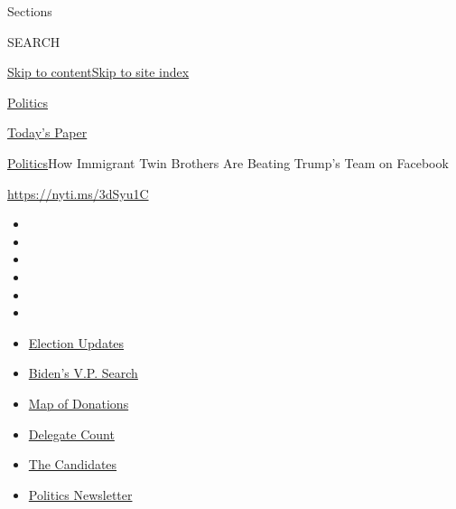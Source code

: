 Sections

SEARCH

\protect\hyperlink{site-content}{Skip to
content}\protect\hyperlink{site-index}{Skip to site index}

\href{https://www.nytimes3xbfgragh.onion/section/politics}{Politics}

\href{https://myaccount.nytimes3xbfgragh.onion/auth/login?response_type=cookie\&client_id=vi}{}

\href{https://www.nytimes3xbfgragh.onion/section/todayspaper}{Today's
Paper}

\href{/section/politics}{Politics}\textbar{}How Immigrant Twin Brothers
Are Beating Trump's Team on Facebook

\url{https://nyti.ms/3dSyu1C}

\begin{itemize}
\item
\item
\item
\item
\item
\item
\end{itemize}

\begin{itemize}
\item
  \href{https://www.nytimes3xbfgragh.onion/2020/07/31/us/elections/biden-vs-trump.html?action=click\&pgtype=Article\&state=default\&region=TOP_BANNER\&context=storylines_menu}{Election
  Updates}
\item
  \href{https://www.nytimes3xbfgragh.onion/article/biden-vice-president-2020.html?action=click\&pgtype=Article\&state=default\&region=TOP_BANNER\&context=storylines_menu}{Biden's
  V.P. Search}
\item
  \href{https://www.nytimes3xbfgragh.onion/interactive/2020/07/24/us/politics/trump-biden-campaign-donors.html?action=click\&pgtype=Article\&state=default\&region=TOP_BANNER\&context=storylines_menu}{Map
  of Donations}
\item
  \href{https://www.nytimes3xbfgragh.onion/interactive/2020/us/elections/delegate-count-primary-results.html?action=click\&pgtype=Article\&state=default\&region=TOP_BANNER\&context=storylines_menu}{Delegate
  Count}
\item
  \href{https://www.nytimes3xbfgragh.onion/interactive/2019/us/politics/2020-presidential-candidates.html?action=click\&pgtype=Article\&state=default\&region=TOP_BANNER\&context=storylines_menu}{The
  Candidates}
\item
  \href{https://www.nytimes3xbfgragh.onion/newsletters/politics?action=click\&pgtype=Article\&state=default\&region=TOP_BANNER\&context=storylines_menu}{Politics
  Newsletter}
\end{itemize}

